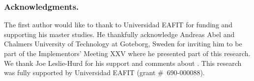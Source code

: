 \documentclass[../main.tex]{subfiles}
\begin{document}

\subsubsection*{Acknowledgments.}

The first author would like to thank to Universidad EAFIT for funding
and supporting his master studies. He thankfully acknowledge Andreas
Abel and Chalmers University of Technology at Goteborg, Sweden for
inviting him to be part of the \Agda Implementors’ Meeting XXV where
he presented part of this research. We thank Joe Leslie-Hurd for his
support and comments about \Metis.  This research was fully supported
by Universidad EAFIT (grant \#~690-000088).
\end{document}
